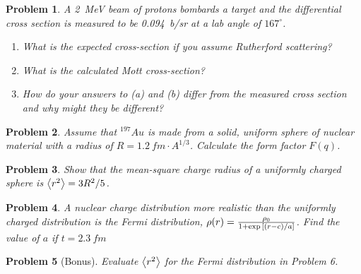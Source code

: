 \documentclass{article}
\newtheorem{plm}{Problem}
\begin{document}
\begin{plm}
  A \SI{2}{MeV} beam of protons bombards a  target and the differential cross section is measured to be \SI{0.094}{b/sr}
  at a lab angle of $167^{\circ}$.
  \begin{enumerate}
  \item What is the expected cross-section if you assume Rutherford scattering?
  \item What is the calculated Mott cross-section?
  \item How do your answers to (a) and (b) differ from the measured cross section and why might they be different?
  \end{enumerate}
\end{plm}
\begin{plm}
  Assume that $^{197}Au$ is made from a solid, uniform sphere of nuclear material with a radius of $R = \SI{1.2}{fm} \cdot A^{1/3}$.
  Calculate the form factor $F(q)$.
\end{plm}
\begin{plm}
  Show that the mean-square charge radius of a uniformly charged sphere is $\expval{r^{2}} = 3R^{2}/5$.
\end{plm}
\begin{plm}
  A nuclear charge distribution more realistic than the uniformly charged distribution is the Fermi distribution,
  $\rho(r) = \frac{\rho_{0}}{1 + \exp\qty[(r - c)/a]}$.
  Find the value of $a$ if $t = \SI{2.3}{fm}$
\end{plm}
\begin{plm}[Bonus]
  Evaluate $\expval{r^{2}}$ for the Fermi distribution in Problem 6.
\end{plm}
\end{document}
